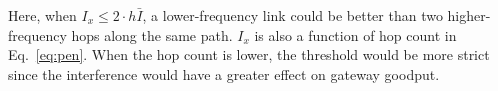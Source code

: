 Here, when $I_x \leq 2\cdot h\bar{I}$, a lower-frequency link could 
be better than two higher-frequency hops along the same path. $I_x$ is also a function of hop count 
in Eq.~\ref{eq:pen}. When the hop count is lower, the threshold would be more strict since the
interference would have a greater effect on gateway goodput.



